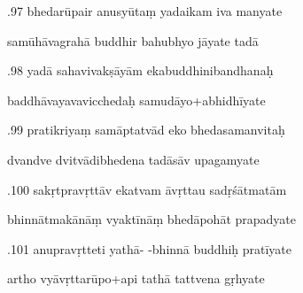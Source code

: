 \documentclass[article,12pt,a4paper]{memoir}%
\newcounter{parCount}
\begin{document}
	  
	  \pstart {}.97 bhedarūpair anusyūtaṃ yadaikam iva manyate 
	{}
	\pend%
      

	  
	  \pstart \leavevmode%
	samūhāvagrahā buddhir bahubhyo jāyate tadā 
	{}
	\pend%
      

	  
	  \pstart {}.98 yadā sahavivakṣāyām ekabuddhinibandhanaḥ 
	{}
	\pend%
      

	  
	  \pstart \leavevmode%
	baddhāvayavavicchedaḥ samudāyo+abhidhīyate 
	{}
	\pend%
      

	  
	  \pstart {}.99 pratikriyaṃ samāptatvād eko bhedasamanvitaḥ 
	{}
	\pend%
      

	  
	  \pstart \leavevmode%
	dvandve dvitvādibhedena tadāsāv upagamyate 
	{}
	\pend%
      

	  
	  \pstart {}.100 sakṛtpravṛttāv ekatvam āvṛttau sadṛśātmatām 
	{}
	\pend%
      

	  
	  \pstart \leavevmode%
	bhinnātmakānāṃ vyaktīnāṃ bhedāpohāt prapadyate 
	{}
	\pend%
      

	  
	  \pstart {}.101 anupravṛtteti yathā- -bhinnā buddhiḥ pratīyate 
	{}
	\pend%
      

	  
	  \pstart \leavevmode%
	artho vyāvṛttarūpo+api tathā tattvena gṛhyate 
	{}
	\pend%
      
\end{document}

